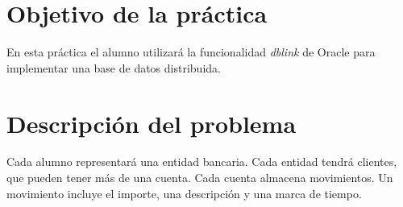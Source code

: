 
\usepackage{eurosym}
\usepackage{needspace}




\renewcommand{\hmwkTitle}{Práctica DBLinks}
\renewcommand{\hmwkClass}{Bases de datos}

\usepackage{blindtext}






\primerapagina

\setlength{\parindent}{1em}
\setlength{\parskip}{1em}

\section{Objetivo de la práctica}
En esta práctica el alumno utilizará la funcionalidad \textit{dblink} de Oracle para implementar una base de datos distribuida.



\section{Descripción del problema}
Cada alumno representará una entidad bancaria. Cada entidad tendrá clientes, que pueden tener más de una cuenta.
Cada cuenta almacena movimientos. Un movimiento incluye el importe, una descripción y una marca de tiempo.



